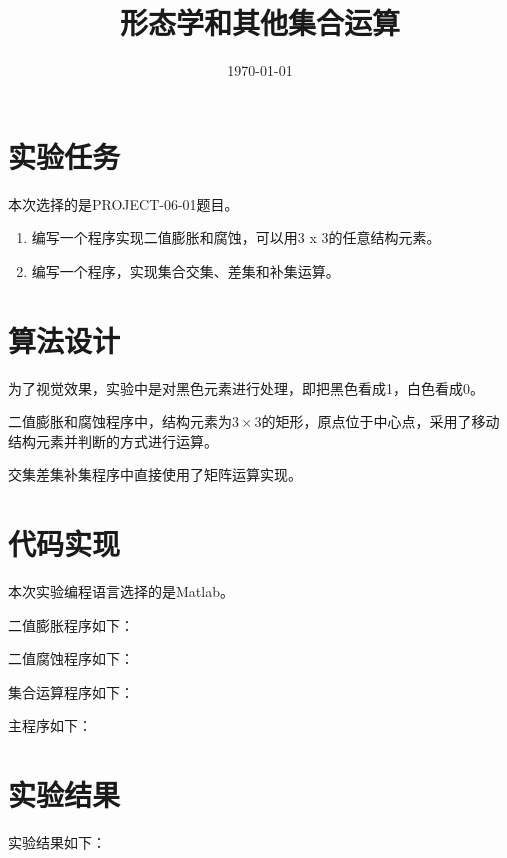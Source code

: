 \documentclass{../source/Experiment}
\title{形态学和其他集合运算}
\date{\today}
\begin{document}
    \makecover
    \section{实验任务}

        本次选择的是PROJECT-06-01题目。

        \begin{enumerate}
            \item 编写一个程序实现二值膨胀和腐蚀，可以用3 x 3的任意结构元素。
            \item 编写一个程序，实现集合交集、差集和补集运算。
        \end{enumerate}

    \section{算法设计}

        为了视觉效果，实验中是对黑色元素进行处理，即把黑色看成1，白色看成0。
        
        二值膨胀和腐蚀程序中，结构元素为$3\times3$的矩形，原点位于中心点，采用了移动结构元素并判断的方式进行运算。

        交集差集补集程序中直接使用了矩阵运算实现。

    \section{代码实现}
        本次实验编程语言选择的是Matlab。

        二值膨胀程序如下：
        

        二值腐蚀程序如下：
        


        集合运算程序如下：
        

        主程序如下：

        

    \section{实验结果}
        实验结果如下：
\end{document}

